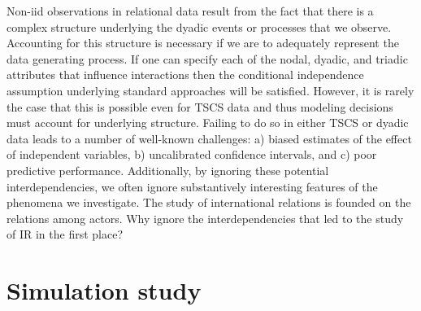 \documentclass[12pt]{amsart}
\begin{document}

Non-iid observations in relational data result from the fact that there is a complex structure underlying the dyadic events or processes that we observe. Accounting for this structure is necessary if we are to adequately represent the data generating process. If one can specify each of the nodal, dyadic, and triadic attributes that influence interactions then the conditional independence assumption underlying standard approaches will be satisfied. However, it is rarely the case that this is possible even for TSCS data and thus modeling decisions must account for underlying structure. Failing to do so in either TSCS or dyadic data leads to a number of well-known challenges: a) biased estimates of the effect of independent variables, b) uncalibrated confidence intervals, and c) poor predictive performance. Additionally, by ignoring these potential interdependencies, we often ignore substantively interesting features of the phenomena we investigate. The study of international relations is founded on the relations among actors. Why ignore the interdependencies that led to the study of IR in the first place?

\section{\textbf{Simulation study}}
\end{document}
